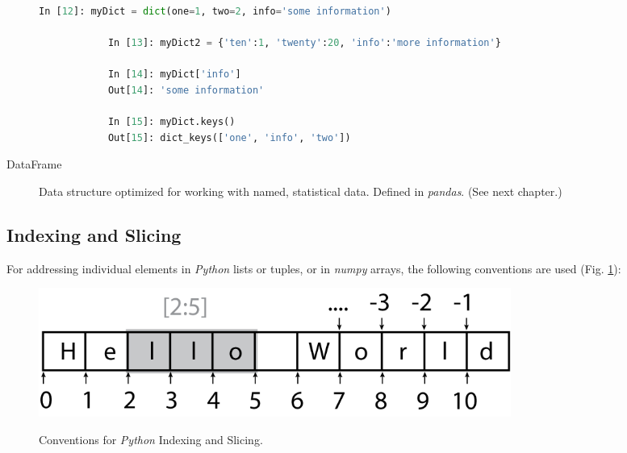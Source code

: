 \begin{description}
      \begin{lstlisting}[language=Python]
            In [12]: myDict = dict(one=1, two=2, info='some information')

            In [13]: myDict2 = {'ten':1, 'twenty':20, 'info':'more information'}

            In [14]: myDict['info']
            Out[14]: 'some information'

            In [15]: myDict.keys()
            Out[15]: dict_keys(['one', 'info', 'two'])
      \end{lstlisting}

  \item[DataFrame] Data structure optimized for working with named, statistical data. Defined in \emph{pandas}. (See next chapter.)
\end{description}


\subsection{Indexing and Slicing}

For addressing individual elements in \emph{Python} lists or tuples, or in \emph{numpy} arrays, the following conventions are used (Fig. \ref{fig:indexing}):

\begin{figure}[H]
  \centering
  \includegraphics[width=0.75\textwidth]{../Images/IndexingAndSlicing.png}\\
  \caption{Conventions for \emph{Python} Indexing and Slicing.}
  \label{fig:indexing}
\end{figure}

